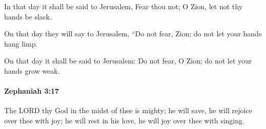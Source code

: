 			\begin{versebox}
					\item[BHS] 
					\item[LXX] 
					\item[ASV] In that day it shall be said to Jerusalem, Fear thou not; O Zion, let not thy hands be slack.
					\item[NIV] On that day they will say to Jerusalem, “Do not fear, Zion; do not let your hands hang limp.
					\item[NRSV] On that day it shall be said to Jerusalem: Do not fear, O Zion; do not let your hands grow weak.
			\end{versebox}

		\paragraph{Zephaniah 3:17} %
			\label{ZEPHANIAH-3-17}

			The LORD thy God in the midst of thee is mighty; he will save, he will rejoice over thee with joy; he will rest in his love, he will joy over thee with singing.


